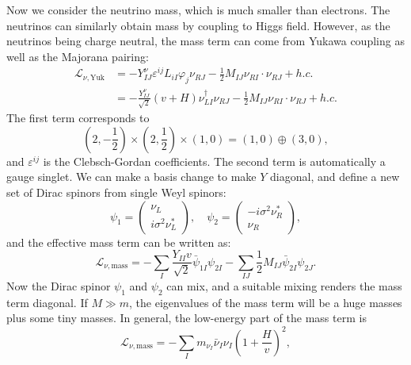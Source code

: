 \documentclass[aps,prb,superscriptaddress,nofootinbib]{revtex4}
\begin{document}
Now we consider the neutrino mass, which is much smaller than electrons.
The neutrinos can similarly obtain mass by coupling to Higgs field.
However, as the neutrinos being charge neutral, the mass term can come from Yukawa coupling as well as the Majorana pairing:
\begin{equation}
\begin{aligned}
	\mathcal L_{\nu,\mathrm{Yuk}} 
	&= - Y^\nu_{IJ} \varepsilon^{ij} L_{iI} \varphi_j \nu_{RJ} - \frac{1}{2} M_{IJ} \nu_{RI} \cdot \nu_{RJ} + h.c. \\
	&= -\frac{Y^\nu_{IJ}}{\sqrt 2}(v+H) \nu_{LI}^\dagger \nu_{RJ} - \frac{1}{2}M_{IJ}\nu_{RI}\cdot \nu_{RJ} + h.c.
\end{aligned}
\end{equation}
The first term corresponds to
\begin{equation}
	\left(2, -\frac{1}{2}\right) \times \left(2, \frac{1}{2}\right) \times \left(1, 0\right) = \left(1,0\right) \oplus(3,0),
\end{equation}
and $\varepsilon^{ij}$ is the Clebsch-Gordan coefficients.
The second term is automatically a gauge singlet.
We can make a basis change to make $Y$ diagonal, and define a new set of Dirac spinors from single Weyl spinors:
\begin{equation}
	\psi_1 = \begin{pmatrix}
		\nu_L \\ i\sigma^2 \nu_L^*
	\end{pmatrix}, \quad
	\psi_2 = \begin{pmatrix}
		-i\sigma^2 \nu_R^* \\ \nu_R
	\end{pmatrix},
\end{equation}
and the effective mass term can be written as:
\begin{equation}
	\mathcal L_{\nu,\mathrm{mass}} 
	= -\sum_I \frac{Y_{II} v}{\sqrt 2}\bar\psi_{1I} \psi_{2I} - \sum_{IJ}\frac{1}{2} M_{IJ} \bar\psi_{2I} \psi_{2J}.
\end{equation}
Now the Dirac spinor $\psi_1$ and $\psi_2$ can mix, and a suitable mixing renders the mass term diagonal.
If $M \gg m$, the eigenvalues of the mass term will be a huge masses plus some tiny masses.
In general, the low-energy part of the mass term is
\begin{equation}
	\mathcal L_{\nu,\mathrm{mass}} = -\sum_I m_{\nu_I}\bar\nu_I \nu_I \left(1+\frac{H}{v}\right)^2,
\end{equation}
\end{document}
